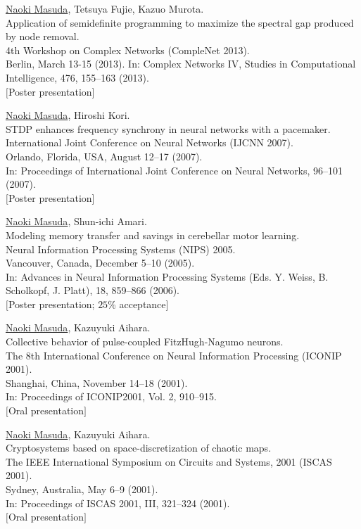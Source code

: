 \documentclass[11pt,letter]{article}
\begin{document}
\begin{etaremune}
\item \underline{Naoki Masuda}, Tetsuya Fujie, Kazuo Murota.\\
Application of semidefinite programming to maximize the spectral gap produced by node removal.\\
4th Workshop on Complex Networks (CompleNet 2013).\\
Berlin, March 13-15 (2013).
In: Complex Networks IV, Studies in Computational Intelligence, 476, 155--163 (2013).\\
$[$Poster presentation$]$

\item \underline{Naoki Masuda}, Hiroshi Kori.\\
STDP enhances frequency synchrony in neural networks with a pacemaker.\\
International Joint Conference on Neural Networks (IJCNN 2007).\\
Orlando, Florida, USA, August 12--17 (2007).\\
In: Proceedings of International Joint Conference on Neural Networks, 96--101 (2007).\\
$[$Poster presentation$]$

\item \underline{Naoki Masuda}, Shun-ichi Amari.\\
Modeling memory transfer and savings in cerebellar motor learning.\\
Neural Information Processing Systems (NIPS) 2005.\\
Vancouver, Canada, December 5--10 (2005).\\
In: Advances in Neural Information Processing Systems (Eds. Y. Weiss, B. Scholkopf, J. Platt), 18, 859--866 (2006).\\
$[$Poster presentation; $25$\% acceptance$]$


\item \underline{Naoki Masuda}, Kazuyuki Aihara.\\
Collective behavior of pulse-coupled FitzHugh-Nagumo neurons.\\
The 8th International Conference on Neural Information Processing (ICONIP 2001).\\
Shanghai, China, November 14--18 (2001).\\
In: Proceedings of ICONIP2001, Vol. 2, 910--915.\\
$[$Oral presentation$]$

\item \underline{Naoki Masuda}, Kazuyuki Aihara.\\
Cryptosystems based on space-discretization of chaotic maps.\\
The IEEE International Symposium on Circuits and Systems, 2001 (ISCAS 2001).\\
Sydney, Australia, May 6--9 (2001).\\
In: Proceedings of ISCAS 2001, III, 321--324 (2001).\\
$[$Oral presentation$]$
    

\end{etaremune}
\end{document}
